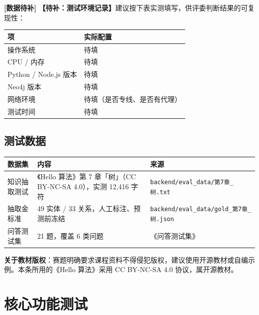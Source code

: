 \documentclass[UTF8,a4paper,11pt]{ctexrep}
\newcommand{\todomark}{\textcolor{todobar}{\textbf{[数据待补]}}}
\begin{document}
\begin{todobox}
\todomark{} \textbf{【待补：测试环境记录】}建议按下表实测填写，供评委判断结果的可复现性：

\begin{center}
\small
\begin{tabularx}{\linewidth}{@{}XX@{}}
\toprule
项 & 实际配置 \\
\midrule
操作系统 & 待填 \\
CPU / 内存 & 待填 \\
Python / Node.js 版本 & 待填 \\
Neo4j 版本 & 待填 \\
网络环境 & 待填（是否专线、是否有代理） \\
测试时间 & 待填 \\
\bottomrule
\end{tabularx}
\end{center}
\end{todobox}


\subsection{测试数据}

\begin{center}
\small
\begin{tabularx}{\linewidth}{@{}XXX@{}}
\toprule
数据集 & 内容 & 来源 \\
\midrule
知识抽取测试 & 《Hello 算法》第 7 章「树」（CC BY-NC-SA 4.0），实测 12,416 字符 & \texttt{backend/eval\_data/第7章\_树.txt} \\
抽取金标准 & 49 实体 / 33 关系，人工标注、预测前冻结 & \texttt{backend/eval\_data/gold\_第7章\_树.json} \\
问答测试集 & 21 题，覆盖 6 类问题 & 《问答测试集》 \\
\bottomrule
\end{tabularx}
\end{center}
\begin{notebox}
\textbf{关于教材版权}：赛题明确要求课程资料不得侵犯版权，建议使用开源教材或自编示例。本条所用的《Hello 算法》采用 CC BY-NC-SA 4.0 协议，属开源教材。

\end{notebox}


\section{核心功能测试}
\end{document}

